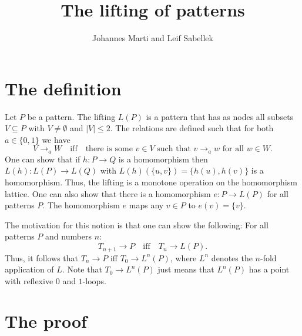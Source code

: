 \documentclass[a4paper]{article}
\title{The lifting of patterns}
\author{Johannes Marti and Leif Sabellek}
\renewcommand{\iff}{\quad \mbox{iff} \quad}
\begin{document}


\section{The definition}

Let $P$ be a pattern. The lifting $L(P)$ is a pattern that has as nodes
all subsets $V \subseteq P$ with $V \neq \emptyset$ and $|V| \leq 2$.
The relations are defined such that for both $a \in \{0,1\}$ we have
\[
 V \rightarrow_a W \iff \mbox{there is some } v \in V \mbox{ such that }
v \rightarrow_a w \mbox{ for all } w \in W.
\]
One can show that if $h : P \to Q$ is a homomorphism then $L(h) : L(P)
\to L(Q)$ with $L(h)(\{u,v\}) = \{h(u),h(v)\}$ is a homomorphism. Thus,
the lifting is a monotone operation on the homomorphism lattice. One can
also show that there is a homomorphism $e : P \to L(P)$ for all patterns
$P$. The homomorphism $e$ maps any $v \in P$ to $e(v) = \{v\}$.

The motivation for this notion is that one can show the following: For
all patterns $P$ and numbers $n$:
\begin{equation} \label{eq:lifting property}
 T_{n + 1} \to P \iff T_n \to L(P).
\end{equation}
Thus, it follows that $T_n \to P$ iff $T_0 \to L^n(P)$, where $L^n$
denotes the $n$-fold application of $L$. Note that $T_0 \to L^n(P)$ just
means that $L^n(P)$ has a point with reflexive $0$ and $1$-loops.


\section{The proof}
\end{document}
